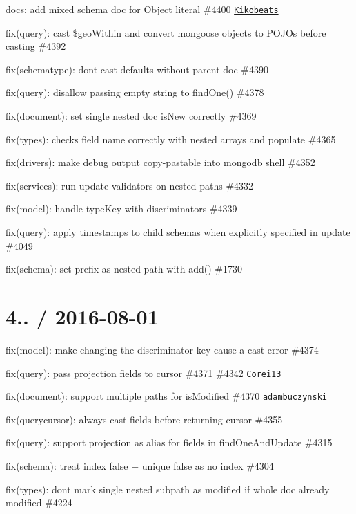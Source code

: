 \begin{DoxyItemize}
\item docs\+: add mixed schema doc for Object literal \#4400 \href{https://github.com/Kikobeats}{\tt Kikobeats}
\item fix(query)\+: cast \$geo\+Within and convert mongoose objects to P\+O\+J\+Os before casting \#4392
\item fix(schematype)\+: dont cast defaults without parent doc \#4390
\item fix(query)\+: disallow passing empty string to find\+One() \#4378
\item fix(document)\+: set single nested doc is\+New correctly \#4369
\item fix(types)\+: checks field name correctly with nested arrays and populate \#4365
\item fix(drivers)\+: make debug output copy-\/pastable into mongodb shell \#4352
\item fix(services)\+: run update validators on nested paths \#4332
\item fix(model)\+: handle type\+Key with discriminators \#4339
\item fix(query)\+: apply timestamps to child schemas when explicitly specified in update \#4049
\item fix(schema)\+: set prefix as nested path with add() \#1730
\end{DoxyItemize}

\section*{4.. / 2016-\/08-\/01 }


\begin{DoxyItemize}
\item fix(model)\+: make changing the discriminator key cause a cast error \#4374
\item fix(query)\+: pass projection fields to cursor \#4371 \#4342 \href{https://github.com/Corei13}{\tt Corei13}
\item fix(document)\+: support multiple paths for is\+Modified \#4370 \href{https://github.com/adambuczynski}{\tt adambuczynski}
\item fix(querycursor)\+: always cast fields before returning cursor \#4355
\item fix(query)\+: support projection as alias for fields in find\+One\+And\+Update \#4315
\item fix(schema)\+: treat index false + unique false as no index \#4304
\item fix(types)\+: dont mark single nested subpath as modified if whole doc already modified \#4224
\end{DoxyItemize}

